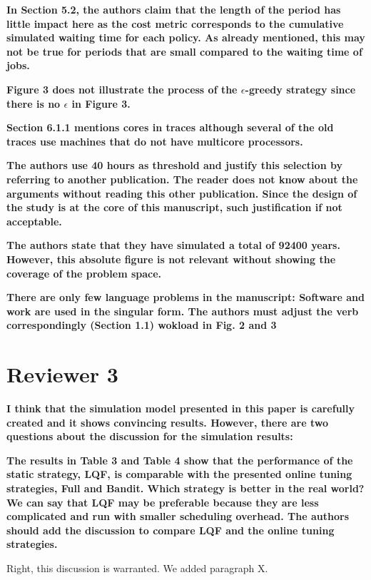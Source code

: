 \documentclass[]{article}
\begin{document}
\textbf{In Section 5.2, the authors claim that the length of the period has little impact here as the cost metric corresponds
to the cumulative simulated waiting time for each policy. As already mentioned, this may not be true for periods that
are small compared to the waiting time of jobs.
}

\textbf{Figure 3 does not illustrate the process of the $\epsilon$-greedy strategy since there is no $\epsilon$ in Figure 3.
}

\textbf{Section 6.1.1 mentions cores in traces although several of the old traces use machines that do not have multicore
processors.
}

\textbf{The authors use 40 hours as threshold and justify this selection by referring to another publication. The reader does
not know about the arguments without reading this other publication. Since the design of the study is at the core of
this manuscript, such justification if not acceptable.
}

\textbf{The authors state that they have simulated a total of 92400 years. However, this absolute figure is not relevant
without showing the coverage of the problem space.
}

\textbf{There are only few language problems in the manuscript:
Software and work are used in the singular form. The authors must adjust the verb correspondingly (Section 1.1)
wokload in Fig. 2 and 3
}



\section{Reviewer 3}

\textbf{I think that the simulation model presented in this paper is carefully created and it shows convincing results.
However, there are two questions about the discussion for the simulation results:
}

\textbf{The results in Table 3 and Table 4 show that the performance of the static strategy, LQF, is comparable with the
presented online tuning strategies, Full and Bandit. Which strategy is better in the real world? We can say that LQF
may be preferable because they are less complicated and run with smaller scheduling overhead. The authors should add
the discussion to compare LQF and the online tuning strategies.
}

Right, this discussion is warranted. We added paragraph X.
\end{document}
